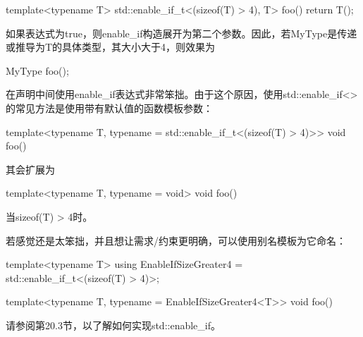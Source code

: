 \begin{cpp}
template<typename T>
std::enable_if_t<(sizeof(T) > 4), T>
foo() {
	return T();
}
\end{cpp}

如果表达式为true，则enable\_if构造展开为第二个参数。因此，若MyType是传递或推导为T的具体类型，其大小大于4，则效果为

\begin{cpp}
MyType foo();
\end{cpp}

在声明中间使用enable\_if表达式非常笨拙。由于这个原因，使用std::enable\_if<>的常见方法是使用带有默认值的函数模板参数： 

\begin{cpp}
template<typename T,
		typename = std::enable_if_t<(sizeof(T) > 4)>>
void foo() {
}
\end{cpp}

其会扩展为

\begin{cpp}
template<typename T,
		typename = void>
void foo() {
}
\end{cpp}

当sizeof(T) > 4时。

若感觉还是太笨拙，并且想让需求/约束更明确，可以使用别名模板为它命名：

\begin{cpp}
template<typename T>
using EnableIfSizeGreater4 = std::enable_if_t<(sizeof(T) > 4)>;

template<typename T,
	typename = EnableIfSizeGreater4<T>>
void foo() {
}
\end{cpp}

请参阅第20.3节，以了解如何实现std::enable\_if。










